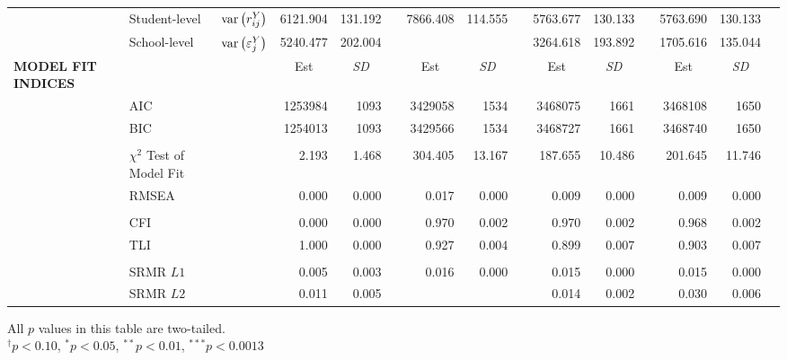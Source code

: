 {\begin{tabular}{l @{\hskip -7.9cm} l c rr @{\hskip -0.1mm}l rr @{\hskip -0.1mm}l rr @{\hskip -0.1mm}l rr @{\hskip -0.1mm}l}
    & Student-level & $\text{var}\left(r^Y_{ij}\right)$ & 6121.904 & 131.192 &       & 7866.408 & 114.555 &       & 5763.677 & 130.133 &       & 5763.690 & 130.133 &  \\
    & School-level & $\text{var}\left(\varepsilon^Y_j\right)$ & 5240.477 & 202.004 &       &       &       &       & 3264.618 & 193.892 &       & 1705.616 & 135.044 &  \\
\midrule
    \textbf{MODEL FIT INDICES} &       &       & \multicolumn{1}{c}{Est} & \multicolumn{1}{c}{\textit{SD}} &       & \multicolumn{1}{c}{Est} & \multicolumn{1}{c}{\textit{SD}} &       & \multicolumn{1}{c}{Est} & \multicolumn{1}{c}{\textit{SD}} &       & \multicolumn{1}{c}{Est} & \multicolumn{1}{c}{\textit{SD}} &  \\
    \cmidrule{4-5}\cmidrule{7-8}\cmidrule{10-11}\cmidrule{13-14}          & AIC   &       & 1253984 & 1093  &       & 3429058 & 1534  &       & 3468075 & 1661  &       & 3468108 & 1650  &  \\
    & BIC   &       & 1254013 & 1093  &       & 3429566 & 1534  &       & 3468727 & 1661  &       & 3468740 & 1650  &  \\
    &&&&&&&&&&&&&&\\
    & $\chi^2$ Test of Model Fit &       & 2.193 & 1.468 &       & 304.405 & 13.167 &       & 187.655 & 10.486 &       & 201.645 & 11.746 &  \\
    & RMSEA &       & 0.000 & 0.000 &       & 0.017 & 0.000 &       & 0.009 & 0.000 &       & 0.009 & 0.000 &  \\
    &&&&&&&&&&&&&&\\
    & CFI   &       & 0.000 & 0.000 &       & 0.970 & 0.002 &       & 0.970 & 0.002 &       & 0.968 & 0.002 &  \\
    & TLI   &       & 1.000 & 0.000 &       & 0.927 & 0.004 &       & 0.899 & 0.007 &       & 0.903 & 0.007 &  \\
    &&&&&&&&&&&&&&\\
    & SRMR $L1$ &       & 0.005 & 0.003 &       & 0.016 & 0.000 &       & 0.015 & 0.000 &       & 0.015 & 0.000 &  \\
    & SRMR $L2$ &       & 0.011 & 0.005 &       &       &       &       & 0.014 & 0.002 &       & 0.030 & 0.006 &  \\
\bottomrule
    \end{tabular}
}{All $p$ values in this table are two-tailed. \\
$^\dagger p < 0.10$, $^* p < 0.05$, $^{**} p < 0.01$, $^{***} p < 0.001$}{3}
